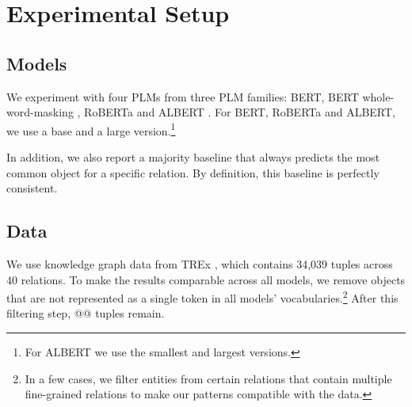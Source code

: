 \section{Experimental Setup}
\label{sec:setup}

\subsection{Models}
We experiment with four PLMs
from three PLM families: BERT, BERT whole-word-masking
\cite{bert}, RoBERTa \cite{roberta} and ALBERT
\cite{albert}. For BERT, RoBERTa and ALBERT, we use a base and a large version.\footnote{For ALBERT we use the smallest and largest versions.}


In addition, we also report a majority baseline that always predicts the most common object for a specific relation. By definition, this baseline is perfectly consistent.

\subsection{Data}



We use knowledge graph data from TREx \cite{trex}, which
contains 34,039 tuples across 40 relations. To make the
results comparable across all models, we remove objects that
are not represented as a single token in all models'
vocabularies.\footnote{In a few cases, we filter entities from certain relations that contain multiple fine-grained relations to make our patterns compatible with the data.}
After this filtering step, @@ tuples remain.

